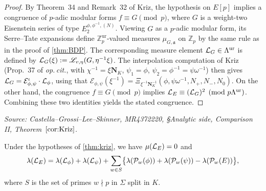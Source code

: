 \begin{proof}
  By Theorem~34 and Remark~32 of Kriz, the hypothesis on \(E[p]\) implies a congruence of \(p\)-adic modular forms \(f\equiv G\pmod{p}\), where \(G\) is a weight-two Eisenstein series of type \(E_2^{\phi,\phi^{-1},(N)}\). Viewing \(G\) as a \(p\)-adic modular form, its Serre--Tate expansions define \(\mathbb{Z}_p^{\mathrm{ur}}\)-valued measures \(\mu_{G,\mathfrak{a}}\) on \(\mathbb{Z}_p\) by the same rule as in the proof of \cref{thm:BDP}. The corresponding measure element \(\mathcal{L}_G \in \Lambda^{\mathrm{ur}}\) is defined by \(\mathcal{L}_G(\xi) := \mathscr{L}_{v,\eta}(G, \eta^{-1}\xi)\). The interpolation computation of Kriz (Prop.~37 of \emph{op.\,cit.}, with \(\chi^{-1} = \xi\mathbf{N}_K\), \(\psi_1 = \phi\), \(\psi_2 = \phi^{-1} = \psi\omega^{-1}\)) then gives \(\mathcal{L}_G = \mathcal{E}_{\phi,\psi}^\iota\cdot\mathcal{L}_\phi\), using that \(\mathcal{E}_{\phi,\psi}(\xi^{-1}) = \Xi_{\xi^{-1}\mathbf{N}_K^{-1}}(\phi,\psi\omega^{-1}, N_+, N_-, N_0)\). On the other hand, the congruence \(f\equiv G\pmod{p}\) implies \(\mathcal{L}_E \equiv (\mathcal{L}_G)^2 \pmod{p\Lambda^{\mathrm{ur}}}\). Combining these two identities yields the stated congruence.
\end{proof}

\begin{corollary}
  \label{cor:Kriz}
  \textit{Source: Castella--Grossi--Lee--Skinner, MR4372220, §Analytic side, Comparison II, Theorem~\(\ref{cor:Kriz}\).}

  Under the hypotheses of \cref{thm:kriz}, we have \(\mu(\mathcal{L}_E) = 0\) and
  \[
    \lambda(\mathcal{L}_E)
    = \lambda(\mathcal{L}_\phi) + \lambda(\mathcal{L}_\psi)
      + \sum_{w\in S}\bigl\{\lambda(\mathcal{P}_w(\phi)) + \lambda(\mathcal{P}_w(\psi)) - \lambda(\mathcal{P}_w(E))\bigr\},
  \]
  where \(S\) is the set of primes \(w\nmid p\) in \(\Sigma\) split in \(K\).
\end{corollary}

